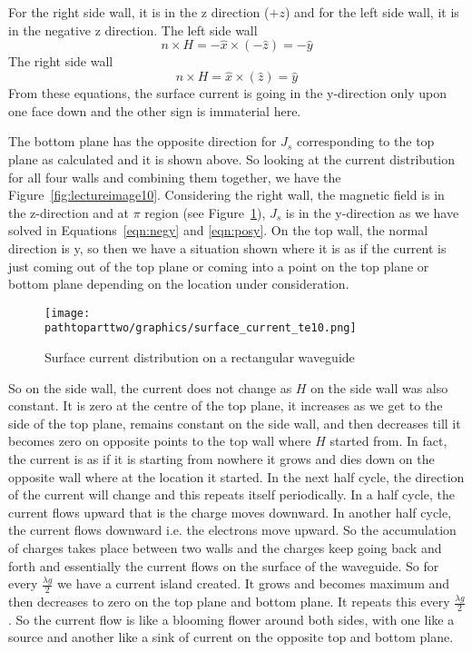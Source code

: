 For the right side wall, it is in the z direction ($+z$) and for the left side wall, it is in the negative z direction. The left side wall   
\begin{equation}
n\times H = -\hat{x} \times (-\hat{z})= -\hat{y}
\label{eqn:negy}
\end{equation}
The right side wall 
\begin{equation}
n \times H = \hat{x} \times (\hat{z}) = \hat{y}
\label{eqn:posy}
\end{equation}
From these equations, the surface current is going in the y-direction only upon one face down and the other sign is immaterial here.
	
The bottom plane has the opposite direction for $J_{s}$ corresponding to the top plane as calculated and it is shown above. So looking at the current distribution for all four walls and combining them together, we have the Figure~\ref{fig:lectureimage10}. Considering the right wall, the magnetic field is in the z-direction and at $\pi$ region (see Figure~\ref{fig:surface_current_te10}), $J_{s}$ is in the y-direction as we have solved in Equations~\ref{eqn:negy} and \ref{eqn:posy}. On the top wall, the normal direction is y, so then we have a situation shown where it is as if the current is just coming out of the top plane or coming into a point on the top plane or bottom plane depending on the location under consideration. 
\begin{figure}[h]
\centering
\texttt{[image: \\pathtoparttwo/graphics/surface\_current\_te10.png]}
\caption{Surface current distribution on a rectangular waveguide}
\label{fig:surface_current_te10}
\end{figure}

So on the side wall, the current does not change as $H$ on the side wall was also constant. It is zero at the centre of the top plane, it increases as we get to the side of the top plane, remains constant on the side wall, and then decreases till it becomes zero on opposite points to the top wall where $H$ started from. In fact, the current is as if it is starting from nowhere it grows and dies down on the opposite wall where at the location it started. In the next half cycle, the direction of the current will change and this repeats itself periodically. In a half cycle, the current flows upward that is the charge moves downward. In another half cycle, the current flows downward i.e. the electrons move upward. So the accumulation of charges takes place between two walls and the charges keep going back and forth and essentially the current flows on the surface of the waveguide. So for every $\frac{\lambda g}{2}$ we have a current island created. It grows and becomes maximum and then decreases to zero on the top plane and bottom plane. It repeats this every $\frac{\lambda g}{2}$. So the current flow is like a blooming flower around both sides, with one like a source and another like a sink of current on the opposite top and bottom plane.
	
